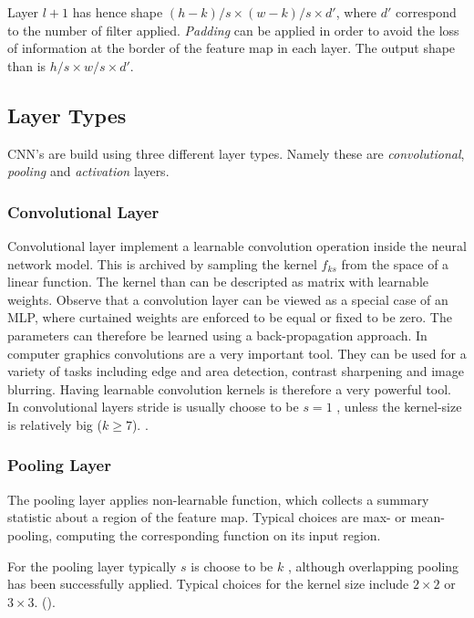 Layer $l+1$ has hence shape $(h - k)/s \times (w-k)/s \times d'$, where $d'$ correspond to the number of filter applied. \emph{Padding} can be applied in order to avoid the loss of information at the border of the feature map in each layer. The output shape than is $h/s \times w/s \times d'$.

\subsection{Layer Types}

CNN's are build using three different layer types. Namely these are \emph{convolutional}, \emph{pooling} and \emph{activation} layers.

\subsubsection{Convolutional Layer}

Convolutional layer implement a learnable convolution operation inside the neural network model. This is archived by sampling the kernel $f_{ks}$ from the space of a linear function. The kernel than can be descripted as matrix with learnable weights. Observe that a convolution layer can be viewed as a special case of an MLP, where curtained weights are enforced to be equal or fixed to be zero. The parameters can therefore be learned using a back-propagation approach. In computer graphics convolutions are a very important tool. They can be used for a variety of tasks including edge and area detection, contrast sharpening and image blurring. Having learnable convolution kernels is therefore a very powerful tool. In convolutional layers stride is usually choose to be $s=1$ , unless the kernel-size is relatively big ($k \geq 7$).  \cite{AlexNet,VGG16,googLeNeT}. 

 
 \subsubsection{Pooling Layer}

The pooling layer applies non-learnable function, which collects a summary statistic about a region of the feature map. Typical choices are max- or mean-pooling, computing the corresponding function on its input region. 

For the pooling layer typically $s$ is choose to be $k$ \cite{VGG16,googLeNeT,overfeat}, although overlapping pooling has been successfully applied. Typical choices for the kernel size include $2 \times 2$ or $3 \times 3$. (\cite{AlexNet,VGG16,googLeNeT}).

